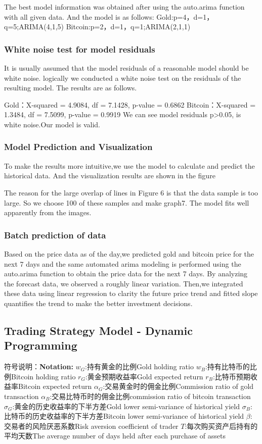 \documentclass{mcmthesis}
\begin{document}
The best model information was obtained after using the auto.arima function with all given data.
And the model is as follows:
Gold:p=4，d=1，q=5;ARIMA(4,1,5)                          Bitcoin:p=2，d=1，q=1;ARIMA(2,1,1) 

\subsubsection{White noise test for model residuals}
It is usually assumed that the model residuals of a reasonable model should be white noise.
logically we conducted a white noise test on the residuals of the resulting model.
The results are as follows.

Gold：X-squared = 4.9084, df = 7.1428, p-value = 0.6862
Bitcoin：X-squared = 1.3484, df = 7.5099, p-value = 0.9919
We can see model residuals p>0.05, is white noise.Our model is valid.


\subsubsection{Model Prediction and Visualization}
To make the results more intuitive,we use the model to calculate and predict the historical data. 
And the visualization results are shown in the figure

The reason for the large overlap of lines in Figure 6 is that the data sample is too large.
So we choose 100 of these samples and make graph7.
The model fits well apparently from the images.


\subsubsection{Batch prediction of data}   %
Based on the price data as of the day,we predicted gold and bitcoin price for the next 7 days 
and the same automated arima modeling is performed using the auto.arima function to obtain the price data for the next 7 days.
By analyzing the forecast data, we observed a roughly linear variation. 
Then,we integrated these data using linear regression to clarity the future price trend 
and fitted slope quantifies the trend to make the better investment decisions.



\subsection{Trading Strategy Model - Dynamic Programming }
符号说明：\textbf{Notation:}
$w_G$:持有黄金的比例Gold holding ratio
$w_B$:持有比特币的比例Bitcoin holding ratio
$r_G$:黄金预期收益率Gold expected return
$r_B$:比特币预期收益率Bitcoin expected return
$\alpha _G$:交易黄金时的佣金比例Commission ratio of gold transaction
$\alpha _B$:交易比特币时的佣金比例commission ratio of bitcoin transaction
$\sigma _G$:黄金的历史收益率的下半方差Gold lower semi-variance of historical yield
$\sigma _B$:比特币的历史收益率的下半方差Bitcoin lower semi-variance of historical yield
$\beta $:交易者的风险厌恶系数Risk aversion coefficient of trader
$T$:每次购买资产后持有的平均天数The average number of days held after each purchase of assets
\end{document}
